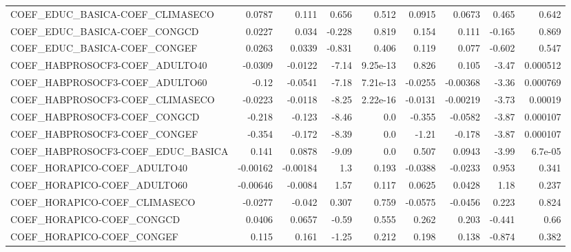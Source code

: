 \begin{tabular}{lrrrrrrrr}
COEF\_EDUC\_BASICA-COEF\_CLIMASECO     &      0.0787 &        0.111 &   0.656 &    0.512 &     0.0915 &      0.0673 &        0.465 &         0.642 \\
COEF\_EDUC\_BASICA-COEF\_CONGCD        &      0.0227 &        0.034 &  -0.228 &    0.819 &      0.154 &       0.111 &       -0.165 &         0.869 \\
COEF\_EDUC\_BASICA-COEF\_CONGEF        &      0.0263 &       0.0339 &  -0.831 &    0.406 &      0.119 &       0.077 &       -0.602 &         0.547 \\
COEF\_HABPROSOCF3-COEF\_ADULTO40      &     -0.0309 &      -0.0122 &   -7.14 & 9.25e-13 &      0.826 &       0.105 &        -3.47 &      0.000512 \\
COEF\_HABPROSOCF3-COEF\_ADULTO60      &       -0.12 &      -0.0541 &   -7.18 & 7.21e-13 &    -0.0255 &    -0.00368 &        -3.36 &      0.000769 \\
COEF\_HABPROSOCF3-COEF\_CLIMASECO     &     -0.0223 &      -0.0118 &   -8.25 & 2.22e-16 &    -0.0131 &    -0.00219 &        -3.73 &       0.00019 \\
COEF\_HABPROSOCF3-COEF\_CONGCD        &      -0.218 &       -0.123 &   -8.46 &      0.0 &     -0.355 &     -0.0582 &        -3.87 &      0.000107 \\
COEF\_HABPROSOCF3-COEF\_CONGEF        &      -0.354 &       -0.172 &   -8.39 &      0.0 &      -1.21 &      -0.178 &        -3.87 &      0.000107 \\
COEF\_HABPROSOCF3-COEF\_EDUC\_BASICA   &       0.141 &       0.0878 &   -9.09 &      0.0 &      0.507 &      0.0943 &        -3.99 &       6.7e-05 \\
COEF\_HORAPICO-COEF\_ADULTO40         &    -0.00162 &     -0.00184 &     1.3 &    0.193 &    -0.0388 &     -0.0233 &        0.953 &         0.341 \\
COEF\_HORAPICO-COEF\_ADULTO60         &    -0.00646 &      -0.0084 &    1.57 &    0.117 &     0.0625 &      0.0428 &         1.18 &         0.237 \\
COEF\_HORAPICO-COEF\_CLIMASECO        &     -0.0277 &       -0.042 &   0.307 &    0.759 &    -0.0575 &     -0.0456 &        0.223 &         0.824 \\
COEF\_HORAPICO-COEF\_CONGCD           &      0.0406 &       0.0657 &   -0.59 &    0.555 &      0.262 &       0.203 &       -0.441 &          0.66 \\
COEF\_HORAPICO-COEF\_CONGEF           &       0.115 &        0.161 &   -1.25 &    0.212 &      0.198 &       0.138 &       -0.874 &         0.382 \\

\end{tabular}
